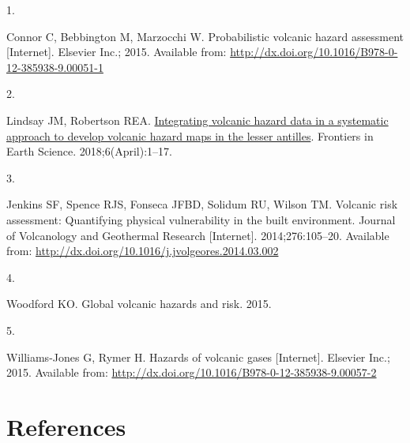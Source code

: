 \documentclass[
  letterpaper,
]{book}
\newlength{\cslhangindent}
\newlength{\csllabelwidth}
\newenvironment{CSLReferences}[2] %
 {\begin{list}{}{%
  \setlength{\itemindent}{0pt}
  \setlength{\leftmargin}{0pt}
  \setlength{\parsep}{0pt}
  \ifodd #1
   \setlength{\leftmargin}{\cslhangindent}
   \setlength{\itemindent}{-1\cslhangindent}
  \fi
  \setlength{\itemsep}{#2\baselineskip}}}
 {\end{list}}
\newcommand{\CSLLeftMargin}[1]{\parbox[t]{\csllabelwidth}{\strut#1\strut}}
\newcommand{\CSLRightInline}[1]{\parbox[t]{\linewidth - \csllabelwidth}{\strut#1\strut}}
\begin{document}
\label{refs}
\begin{CSLReferences}{0}{1}
\CSLLeftMargin{1. }%
\CSLRightInline{Connor C, Bebbington M, Marzocchi W. Probabilistic
volcanic hazard assessment {[}Internet{]}. Elsevier Inc.; 2015.
Available from:
\url{http://dx.doi.org/10.1016/B978-0-12-385938-9.00051-1}}

\CSLLeftMargin{2. }%
\CSLRightInline{Lindsay JM, Robertson REA.
\href{https://doi.org/10.3389/feart.2018.00042}{Integrating volcanic
hazard data in a systematic approach to develop volcanic hazard maps in
the lesser antilles}. Frontiers in Earth Science. 2018;6(April):1--17. }

\CSLLeftMargin{3. }%
\CSLRightInline{Jenkins SF, Spence RJS, Fonseca JFBD, Solidum RU, Wilson
TM. Volcanic risk assessment: Quantifying physical vulnerability in the
built environment. Journal of Volcanology and Geothermal Research
{[}Internet{]}. 2014;276:105--20. Available from:
\url{http://dx.doi.org/10.1016/j.jvolgeores.2014.03.002}}

\CSLLeftMargin{4. }%
\CSLRightInline{Woodford KO. Global volcanic hazards and risk. 2015. }

\CSLLeftMargin{5. }%
\CSLRightInline{Williams-Jones G, Rymer H. Hazards of volcanic gases
{[}Internet{]}. Elsevier Inc.; 2015. Available from:
\url{http://dx.doi.org/10.1016/B978-0-12-385938-9.00057-2}}

\end{CSLReferences}


\chapter*{References}\label{references}

\end{document}
